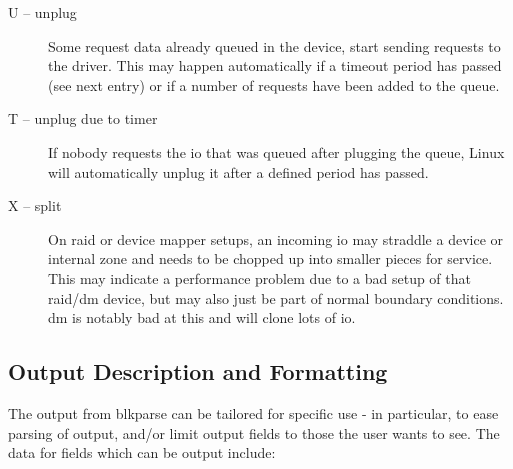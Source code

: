 \documentclass{article}
\begin{document}
\begin{description}
  \item[U -- unplug] Some request data already queued in the device,
  start sending requests to the driver. This may happen automatically
  if a timeout period has passed (see next entry) or if a number of
  requests have been added to the queue.

  \item[T -- unplug due to timer] If nobody requests the io that was queued
  after plugging the queue, Linux will automatically unplug it after a
  defined period has passed.

  \item[X -- split] On raid or device mapper setups, an incoming io may
  straddle a device or internal zone and needs to be chopped up into
  smaller pieces for service. This may indicate a performance problem due
  to a bad setup of that raid/dm device, but may also just be part of
  normal boundary conditions. dm is notably bad at this and will clone
  lots of io.

\end{description}

\subsection{\label{sec:blkparse-format}Output Description and Formatting}

The output from blkparse can be tailored for specific use - in particular,
to ease parsing of output, and/or limit output fields to those the user
wants to see. The data for fields which can be output include:
\end{document}
